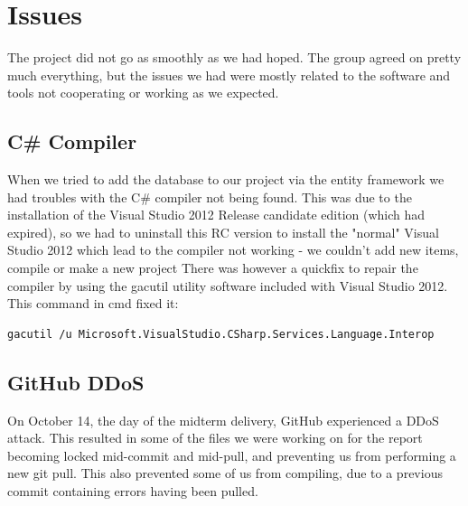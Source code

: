 \section{Issues}
The project did not go as smoothly as we had hoped. The group agreed on pretty much everything, but the issues we had were mostly related to the software and tools not cooperating or working as we expected.

\subsection{C\# Compiler}
When we tried to add the database to our project via the entity framework we had troubles with the C\# compiler not being found. This was due to the installation of the Visual Studio 2012 Release candidate edition (which had expired), so we had to uninstall this RC version to install the "normal" Visual Studio 2012 which lead to the compiler not working - we couldn't add new items, compile or make a new project
There was however a quickfix to repair the compiler by using the gacutil utility software included with Visual Studio 2012.
This command in cmd fixed it:
\begin{verbatim}
gacutil /u Microsoft.VisualStudio.CSharp.Services.Language.Interop 
\end{verbatim}

\subsection{GitHub DDoS}
On October 14, the day of the midterm delivery, GitHub experienced a DDoS attack. This resulted in some of the files we were working on for the report becoming locked mid-commit and mid-pull, and preventing us from performing a new git pull. This also prevented some of us from compiling, due to a previous commit containing errors having been pulled.


